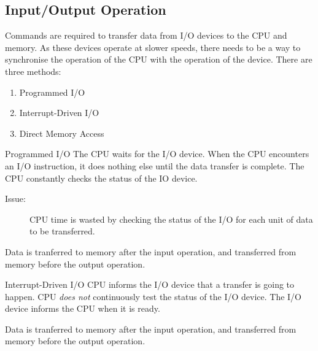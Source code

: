 \documentclass[\main/notes.tex]{subfiles}
\begin{document}
				\subsection{Input/Output Operation}
					Commands are required to transfer data from I/O devices to the CPU and memory. As these devices operate at slower speeds, there needs to be a way to synchronise the operation of the CPU with the operation of the device. There are three methods:
					\begin{enumerate}[nosep]
						\item Programmed I/O
						\item Interrupt-Driven I/O
						\item Direct Memory Access
					\end{enumerate}
					\begin{definition}{Programmed I/O}
						The CPU waits for the I/O device. When the CPU encounters an I/O instruction, it does nothing else until the data transfer is complete. The CPU constantly checks the status of the IO device.
						\begin{description}
							\item[Issue:] CPU time is wasted by checking the status of the I/O for each unit of data to be transferred.
						\end{description}
						Data is tranferred to memory after the input operation, and transferred from memory before the output operation.
					\end{definition}
					\begin{definition}{Interrupt-Driven I/O}
						CPU informs the I/O device that a transfer is going to happen. CPU \emph{does not} continuously test the status of the I/O device. The I/O device informs the CPU when it is ready.
						\par Data is tranferred to memory after the input operation, and transferred from memory before the output operation.
					\end{definition}
\end{document}
